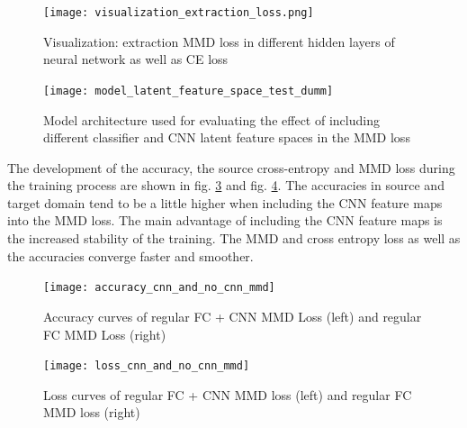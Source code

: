 \begin{figure}[htpb]
  \centering
  \texttt{[image: visualization\_extraction\_loss.png]}
  \caption {Visualization: extraction MMD loss in different hidden layers of neural network as well as CE loss} \label{fig:visualization_extraction_loss}
\end{figure}



\begin{figure}[htpb]
  \centering
  \texttt{[image: model\_latent\_feature\_space\_test\_dumm]}
  \caption {Model architecture used for evaluating the effect of including different classifier and CNN latent feature spaces in the MMD loss} \label{fig:model_latent_feature_space_test_dumm}
\end{figure}

The development of the accuracy, the source cross-entropy and MMD loss during the training process are shown in fig. \ref{fig:accuracy_cnn_and_no_cnn_mmd} and fig. \ref{fig:loss_cnn_and_no_cnn_mmd}. The accuracies in source and target domain tend to be a little higher when including the CNN feature maps into the MMD loss. The main advantage of including the CNN feature maps is the increased stability of the training. The MMD and cross entropy loss as well as the accuracies converge faster and smoother.

\begin{figure}[htpb]
  \centering
  \texttt{[image: accuracy\_cnn\_and\_no\_cnn\_mmd]}
  \caption {Accuracy curves of regular FC + CNN MMD Loss (left) and regular FC MMD Loss (right)} \label{fig:accuracy_cnn_and_no_cnn_mmd}
\end{figure}

\begin{figure}[htpb]
  \centering
  \texttt{[image: loss\_cnn\_and\_no\_cnn\_mmd]}
  \caption {Loss curves of regular FC + CNN MMD loss (left) and regular FC MMD loss (right)} \label{fig:loss_cnn_and_no_cnn_mmd}
\end{figure}

